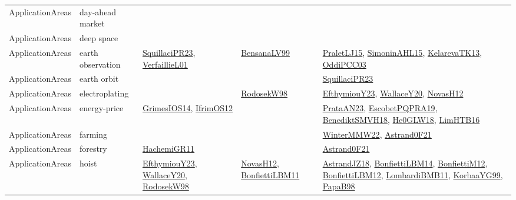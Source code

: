 {\begin{longtable}{lp{3cm}>{\raggedright}p{6cm}>{\raggedright}p{6cm}p{8cm}}
ApplicationAreas & day-ahead market &  &  & \\
ApplicationAreas & deep space &  &  & \\
ApplicationAreas & earth observation & \href{papers/SquillaciPR23.pdf}{SquillaciPR23}\cite{SquillaciPR23}, \href{papers/VerfaillieL01.pdf}{VerfaillieL01}\cite{VerfaillieL01} & \href{articles/BensanaLV99.pdf}{BensanaLV99}\cite{BensanaLV99} & \href{papers/PraletLJ15.pdf}{PraletLJ15}\cite{PraletLJ15}, \href{articles/SimoninAHL15.pdf}{SimoninAHL15}\cite{SimoninAHL15}, \href{papers/KelarevaTK13.pdf}{KelarevaTK13}\cite{KelarevaTK13}, \href{papers/OddiPCC03.pdf}{OddiPCC03}\cite{OddiPCC03}\\
ApplicationAreas & earth orbit &  &  & \href{papers/SquillaciPR23.pdf}{SquillaciPR23}\cite{SquillaciPR23}\\
ApplicationAreas & electroplating &  & \href{papers/RodosekW98.pdf}{RodosekW98}\cite{RodosekW98} & \href{papers/EfthymiouY23.pdf}{EfthymiouY23}\cite{EfthymiouY23}, \href{articles/WallaceY20.pdf}{WallaceY20}\cite{WallaceY20}, \href{articles/NovasH12.pdf}{NovasH12}\cite{NovasH12}\\
ApplicationAreas & energy-price & \href{articles/GrimesIOS14.pdf}{GrimesIOS14}\cite{GrimesIOS14}, \href{papers/IfrimOS12.pdf}{IfrimOS12}\cite{IfrimOS12} &  & \href{articles/PrataAN23.pdf}{PrataAN23}\cite{PrataAN23}, \href{articles/EscobetPQPRA19.pdf}{EscobetPQPRA19}\cite{EscobetPQPRA19}, \href{papers/BenediktSMVH18.pdf}{BenediktSMVH18}\cite{BenediktSMVH18}, \href{papers/He0GLW18.pdf}{He0GLW18}\cite{He0GLW18}, \href{papers/LimHTB16.pdf}{LimHTB16}\cite{LimHTB16}\\
ApplicationAreas & farming &  &  & \href{papers/WinterMMW22.pdf}{WinterMMW22}\cite{WinterMMW22}, \href{papers/Astrand0F21.pdf}{Astrand0F21}\cite{Astrand0F21}\\
ApplicationAreas & forestry & \href{articles/HachemiGR11.pdf}{HachemiGR11}\cite{HachemiGR11} &  & \href{papers/Astrand0F21.pdf}{Astrand0F21}\cite{Astrand0F21}\\
ApplicationAreas & hoist & \href{papers/EfthymiouY23.pdf}{EfthymiouY23}\cite{EfthymiouY23}, \href{articles/WallaceY20.pdf}{WallaceY20}\cite{WallaceY20}, \href{papers/RodosekW98.pdf}{RodosekW98}\cite{RodosekW98} & \href{articles/NovasH12.pdf}{NovasH12}\cite{NovasH12}, \href{papers/BonfiettiLBM11.pdf}{BonfiettiLBM11}\cite{BonfiettiLBM11} & \href{papers/AstrandJZ18.pdf}{AstrandJZ18}\cite{AstrandJZ18}, \href{articles/BonfiettiLBM14.pdf}{BonfiettiLBM14}\cite{BonfiettiLBM14}, \href{papers/BonfiettiM12.pdf}{BonfiettiM12}\cite{BonfiettiM12}, \href{papers/BonfiettiLBM12.pdf}{BonfiettiLBM12}\cite{BonfiettiLBM12}, \href{papers/LombardiBMB11.pdf}{LombardiBMB11}\cite{LombardiBMB11}, \href{papers/KorbaaYG99.pdf}{KorbaaYG99}\cite{KorbaaYG99}, \href{articles/PapaB98.pdf}{PapaB98}\cite{PapaB98}\\

\end{longtable}}
